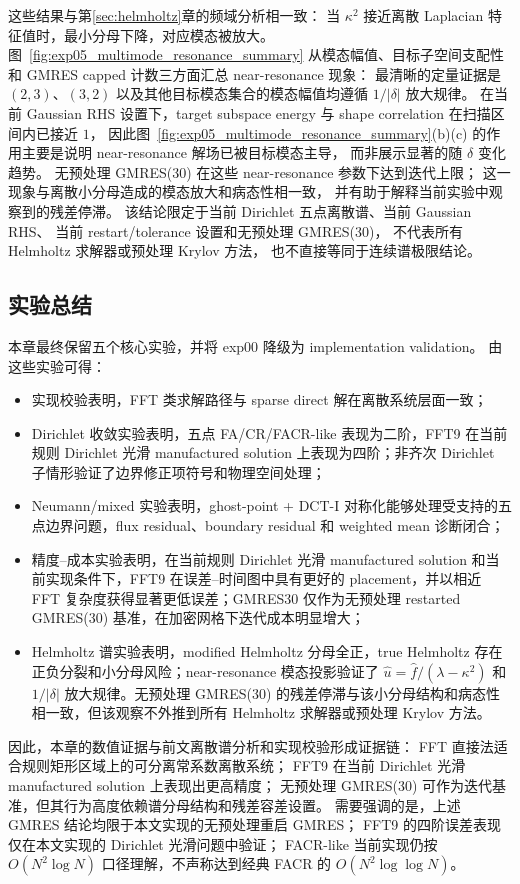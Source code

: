 这些结果与第\ref{sec:helmholtz}章的频域分析相一致：
当 $\kappa^2$ 接近离散 Laplacian 特征值时，最小分母下降，对应模态被放大。
图~\ref{fig:exp05_multimode_resonance_summary} 从模态幅值、目标子空间支配性和 GMRES capped 计数三方面汇总 near-resonance 现象：
最清晰的定量证据是 $(2,3)$、$(3,2)$ 以及其他目标模态集合的模态幅值均遵循 $1/|\delta|$ 放大规律。
在当前 Gaussian RHS 设置下，target subspace energy 与 shape correlation 在扫描区间内已接近 $1$，
因此图~\ref{fig:exp05_multimode_resonance_summary}(b)(c)
的作用主要是说明 near-resonance 解场已被目标模态主导，
而非展示显著的随 $\delta$ 变化趋势。
无预处理 GMRES(30) 在这些 near-resonance 参数下达到迭代上限；
这一现象与离散小分母造成的模态放大和病态性相一致，
并有助于解释当前实验中观察到的残差停滞。
该结论限定于当前 Dirichlet 五点离散谱、当前 Gaussian RHS、
当前 restart/tolerance 设置和无预处理 GMRES(30)，
不代表所有 Helmholtz 求解器或预处理 Krylov 方法，
也不直接等同于连续谱极限结论。

\subsection{实验总结}

本章最终保留五个核心实验，并将 exp00 降级为 implementation validation。
由这些实验可得：
\begin{itemize}[itemsep=2pt]
  \item 实现校验表明，FFT 类求解路径与 sparse direct 解在离散系统层面一致；
  \item Dirichlet 收敛实验表明，五点 FA/CR/FACR-like 表现为二阶，FFT9 在当前规则 Dirichlet 光滑 manufactured solution 上表现为四阶；非齐次 Dirichlet 子情形验证了边界修正项符号和物理空间处理；
  \item Neumann/mixed 实验表明，ghost-point + DCT-I 对称化能够处理受支持的五点边界问题，flux residual、boundary residual 和 weighted mean 诊断闭合；
  \item 精度--成本实验表明，在当前规则 Dirichlet 光滑 manufactured solution 和当前实现条件下，FFT9 在误差--时间图中具有更好的 placement，并以相近 FFT 复杂度获得显著更低误差；GMRES30 仅作为无预处理 restarted GMRES(30) 基准，在加密网格下迭代成本明显增大；
  \item Helmholtz 谱实验表明，modified Helmholtz 分母全正，true Helmholtz 存在正负分裂和小分母风险；near-resonance 模态投影验证了 $\hat u=\hat f/(\lambda-\kappa^2)$ 和 $1/|\delta|$ 放大规律。无预处理 GMRES(30) 的残差停滞与该小分母结构和病态性相一致，但该观察不外推到所有 Helmholtz 求解器或预处理 Krylov 方法。
\end{itemize}

因此，本章的数值证据与前文离散谱分析和实现校验形成证据链：
FFT 直接法适合规则矩形区域上的可分离常系数离散系统；
FFT9 在当前 Dirichlet 光滑 manufactured solution 上表现出更高精度；
无预处理 GMRES(30) 可作为迭代基准，但其行为高度依赖谱分母结构和残差容差设置。
需要强调的是，上述 GMRES 结论均限于本文实现的无预处理重启 GMRES；
FFT9 的四阶误差表现仅在本文实现的 Dirichlet 光滑问题中验证；
FACR-like 当前实现仍按 $O(N^2\log N)$ 口径理解，不声称达到经典 FACR 的 $O(N^2\log\log N)$。
